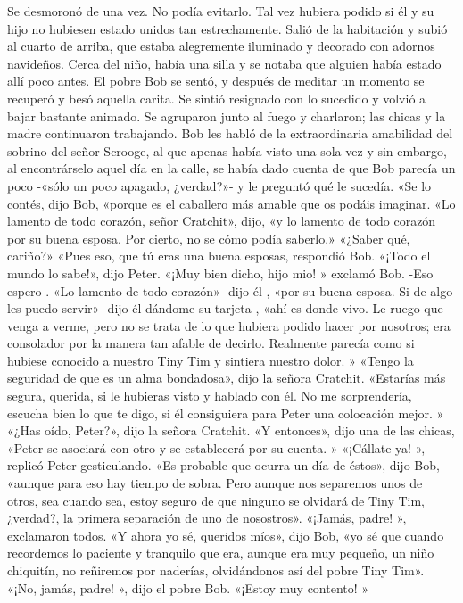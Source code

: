 \documentclass{novela}
\begin{document}
 Se desmoronó de una vez. No podía evitarlo. Tal vez hubiera podido si él y su hijo no hubiesen estado unidos tan estrechamente.
 Salió de la habitación y subió al cuarto de arriba, que estaba alegremente iluminado y decorado con adornos navideños. Cerca del niño, había una silla y se notaba que alguien había estado allí poco antes. El pobre Bob se sentó, y después de meditar un momento se recuperó y besó aquella carita. Se sintió resignado con lo sucedido y volvió a bajar bastante animado.
 Se agruparon junto al fuego y charlaron; las chicas y la madre continuaron trabajando. Bob les habló de la extraordinaria amabilidad del sobrino del señor Scrooge, al que apenas había visto una sola vez y sin embargo, al encontrárselo aquel día en la calle, se había dado cuenta de que Bob parecía un poco -«sólo un poco apagado, ¿verdad?»- y le preguntó qué le sucedía. «Se lo contés, dijo Bob, «porque es el caballero más amable que os podáis imaginar. «Lo lamento de todo corazón, señor Cratchit», dijo, «y lo lamento de todo corazón por su buena esposa. Por cierto, no se cómo podía saberlo.»
 «¿Saber qué, cariño?»
 «Pues eso, que tú eras una buena esposas, respondió Bob.
 «¡Todo el mundo lo sabe!», dijo Peter.
 «¡Muy bien dicho, hijo mio! » exclamó Bob. -Eso espero-. «Lo lamento de todo corazón» -dijo él-, «por su buena esposa. Si de algo les puedo servir» -dijo él dándome su tarjeta-, «ahí es donde vivo. Le ruego que venga a verme, pero no se trata de lo que hubiera podido hacer por nosotros; era consolador por la manera tan afable de decirlo. Realmente parecía como si hubiese conocido a nuestro Tiny Tim y sintiera nuestro dolor. »
 «Tengo la seguridad de que es un alma bondadosa», dijo la señora Cratchit. «Estarías más segura, querida, si le hubieras visto y hablado con él. No me sorprendería, escucha bien lo que te digo, si él consiguiera para Peter una colocación mejor. »
 «¿Has oído, Peter?», dijo la señora Cratchit.
 «Y entonces», dijo una de las chicas, «Peter se asociará con otro y se establecerá por su cuenta. »
 «¡Cállate ya! », replicó Peter gesticulando.
 «Es probable que ocurra un día de éstos», dijo Bob, «aunque para eso hay tiempo de sobra. Pero aunque nos separemos unos de otros, sea cuando sea, estoy seguro de que ninguno se olvidará de Tiny Tim, ¿verdad?, la primera separación de uno de nosostros».
 «¡Jamás, padre! », exclamaron todos.
 «Y ahora yo sé, queridos míos», dijo Bob, «yo sé que cuando recordemos lo paciente y tranquilo que era, aunque era muy pequeño, un niño chiquitín, no reñiremos por naderías, olvidándonos así del pobre Tiny Tim».
 «¡No, jamás, padre! », dijo el pobre Bob. «¡Estoy muy contento! »
\end{document}
